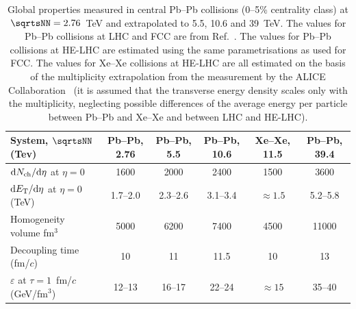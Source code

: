 \documentclass[../report.tex]{subfiles}
\begin{document}
\begin{table}[h]
\caption{Global properties measured in central Pb--Pb collisions (0--5\% centrality class) at $\sqrtsNN=2.76$~TeV and extrapolated to 5.5, 10.6 and 39~TeV. The values for Pb--Pb collisions at LHC and FCC are from Ref.~\cite{Dainese:2016gch}. The values for Pb--Pb collisions at HE-LHC are estimated using the same parametrisations as used for FCC. The values for Xe--Xe collisions at HE-LHC are all estimated on the basis of the multiplicity extrapolation from the measurement by the ALICE Collaboration~\cite{Acharya:2018hhy} (it is assumed that the transverse energy density scales only with the multiplicity, neglecting possible differences of the average energy per particle between Pb--Pb and Xe--Xe and between LHC and HE-LHC).}
\small
\begin{center}
\begin{tabular}{lccccc}
\hline
System, $\sqrtsNN$ (Tev) & Pb--Pb, 2.76 & Pb--Pb, 5.5 & Pb--Pb, 10.6 & Xe--Xe, 11.5 & Pb--Pb, 39.4 \\
\hline
${\rm d}N_{\rm ch}/{\rm d}\eta$ at $\eta=0$ & 1600 & 2000 & 2400 & 1500  & 3600 \\
${\rm d}E_{\rm T}/{\rm d}\eta$ at $\eta=0$ (TeV) & 1.7--2.0 & 2.3--2.6 & 3.1--3.4 & $\approx 1.5$ &  5.2--5.8 \\
Homogeneity volume fm$^3$ & 5000  & 6200 & 7400 & 4500 & 11000 \\
Decoupling time (fm/$c$) & 10 &  11 & 11.5 & 10 & 13 \\
$\varepsilon$ at $\tau=1$~fm/$c$ (GeV/fm$^3$) & 12--13  & 16--17 & 22--24 & $\approx 15$ & 35--40 \\
\hline
\end{tabular}
\end{center}
\label{tab:PbPb}
\end{table}




 
\end{document}
